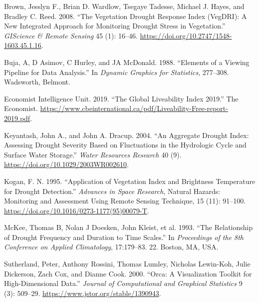 \documentclass[
]{article}
\newlength{\cslhangindent}
\newlength{\cslentryspacingunit} %
\newenvironment{CSLReferences}[2] %
 {%
  \setlength{\parindent}{0pt}
  \ifodd #1
  \let\oldpar\par
  \def\par{\hangindent=\cslhangindent\oldpar}
  \fi
  \setlength{\parskip}{#2\cslentryspacingunit}
 }%
 {}
\begin{document}
\hypertarget{refs}{}
\begin{CSLReferences}{1}{0}
\leavevmode{}%
Brown, Jesslyn F., Brian D. Wardlow, Tsegaye Tadesse, Michael J. Hayes,
and Bradley C. Reed. 2008. {``The {Vegetation} {Drought} {Response}
{Index} ({VegDRI}): {A} {New} {Integrated} {Approach} for {Monitoring}
{Drought} {Stress} in {Vegetation}.''} \emph{GIScience \& Remote
Sensing} 45 (1): 16--46.
\url{https://doi.org/10.2747/1548-1603.45.1.16}.

\leavevmode{}%
Buja, A, D Asimov, C Hurley, and JA McDonald. 1988. {``Elements of a
Viewing Pipeline for Data Analysis.''} In \emph{Dynamic Graphics for
Statistics}, 277--308. Wadsworth, Belmont.

\leavevmode{}%
Economist Intelligence Unit. 2019. {``The Global Liveability Index
2019.''} The Economist.
\url{https://www.cbeinternational.ca/pdf/Liveability-Free-report-2019.pdf}.

\leavevmode{}%
Keyantash, John A., and John A. Dracup. 2004. {``An Aggregate Drought
Index: {Assessing} Drought Severity Based on Fluctuations in the
Hydrologic Cycle and Surface Water Storage.''} \emph{Water Resources
Research} 40 (9). \url{https://doi.org/10.1029/2003WR002610}.

\leavevmode{}%
Kogan, F. N. 1995. {``Application of Vegetation Index and Brightness
Temperature for Drought Detection.''} \emph{Advances in Space Research},
Natural {Hazards}: {Monitoring} and {Assessment} {Using} {Remote}
{Sensing} {Technique}, 15 (11): 91--100.
\url{https://doi.org/10.1016/0273-1177(95)00079-T}.

\leavevmode{}%
McKee, Thomas B, Nolan J Doesken, John Kleist, et al. 1993. {``The
Relationship of Drought Frequency and Duration to Time Scales.''} In
\emph{Proceedings of the 8th Conference on Applied Climatology},
17:179--83. 22. Boston, MA, USA.

\leavevmode{}%
Sutherland, Peter, Anthony Rossini, Thomas Lumley, Nicholas Lewin-Koh,
Julie Dickerson, Zach Cox, and Dianne Cook. 2000. {``Orca: {A}
{Visualization} {Toolkit} for {High}-{Dimensional} {Data}.''}
\emph{Journal of Computational and Graphical Statistics} 9 (3): 509--29.
\url{https://www.jstor.org/stable/1390943}.


\end{CSLReferences}
\end{document}
